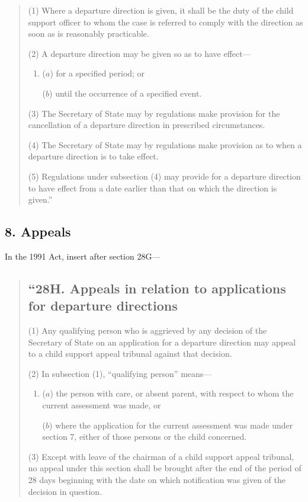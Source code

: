 \documentclass[a4paper]{article}
\begin{document}
{\begin{quotation}
(1) Where a departure direction is given, it shall be the duty of the child support officer to whom the case is referred to comply with the direction as soon as is reasonably practicable.

(2) A departure direction may be given so as to have effect—
\begin{enumerate}\item[]
($a$) for a specified period; or

($b$) until the occurrence of a specified event.
\end{enumerate}

(3) The Secretary of State may by regulations make provision for the cancellation of a departure direction in prescribed circumstances.

(4) The Secretary of State may by regulations make provision as to when a departure direction is to take effect.

(5) Regulations under subsection (4) may provide for a departure direction to have effect from a date earlier than that on which the direction is given.”
\end{quotation}

\subsection{8. Appeals}

In the 1991 Act, insert after section 28G—
\begin{quotation}
\subsection*{“28H. Appeals in relation to applications for departure directions}

(1) Any qualifying person who is aggrieved by any decision of the Secretary of State on an application for a departure direction may appeal to a child support appeal tribunal against that decision.

(2) In subsection (1), “qualifying person” means—
\begin{enumerate}\item[]
($a$) the person with care, or absent parent, with respect to whom the current assessment was made, or

($b$) where the application for the current assessment was made under section 7, either of those persons or the child concerned.
\end{enumerate}

(3) Except with leave of the chairman of a child support appeal tribunal, no appeal under this section shall be brought after the end of the period of 28 days beginning with the date on which notification was given of the decision in question.


\end{quotation}}
\end{document}
